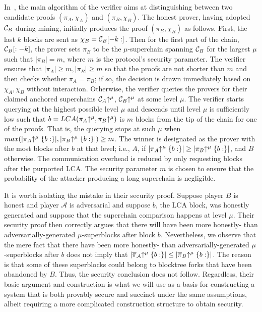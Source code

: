 In~\cite{KLS}, the main algorithm of the verifier aims at distinguishing
between two candidate proofs $(\pi_A, \chi_A)$ and $(\pi_B, \chi_B)$. The honest
prover, having adopted $\mathcal{C}_B$ during mining, initially produces the proof
$(\pi_B, \chi_B)$ as follows. First, the last $k$ blocks are sent as $\chi_B =
\mathcal{C}_B[-k:]$. Then for the first part of the chain, $\mathcal{C}_B[:-k]$, the
prover sets $\pi_B$ to be the $\mu$-superchain spanning $\mathcal{C}_B$ for the
largest $\mu$ such that $|\pi_B| = m$, where $m$ is the protocol's security
parameter. The verifier ensures that $|\pi_A| \geq m, |\pi_B| \geq m$ so that
the proofs are not shorter than $m$ and then checks whether $\pi_A = \pi_B$; if
so, the decision is drawn immediately based on $\chi_A,\chi_B$ without
interaction. Otherwise, the verifier queries the provers for their claimed
anchored superchains $\mathcal{C}_A\negthickspace\uparrow^\mu$, $\mathcal{C}_B\negthickspace\uparrow^\mu$ at some
level $\mu$. The verifier starts querying at the highest possible level $\mu$
and descends until level $\mu$ is sufficiently low such that $b =
LCA(\pi_A\negthickspace\uparrow^\mu, \pi_B\negthickspace\uparrow^\mu)$ is $m$ blocks from the tip of the
chain for one of the proofs. That is, the querying stops at such $\mu$ when
$max(|\pi_A\negthickspace\uparrow^\mu\{b:\}|, |\pi_B\negthickspace\uparrow^\mu\{b:\}|) \geq m$. The winner
is designated as the prover with the most blocks after $b$ at that level; i.e.,
$A$, if $|\pi_A\negthickspace\uparrow^\mu\{b:\}| \geq |\pi_B\negthickspace\uparrow^\mu\{b:\}|$, and $B$
otherwise. The communication overhead is reduced by only requesting blocks after
the purported LCA. The security parameter $m$ is chosen to ensure that the
probability of the attacker producing a long superchain is negligible.

It is worth isolating the mistake in their security proof. Suppose player $B$ is
honest and player $\mathcal{A}$ is adversarial and suppose $b$, the LCA block,
was honestly generated and suppose that the superchain comparison happens at
level $\mu$. Their security proof then correctly argues that there will have
been more honestly- than adversarially-generated $\mu$-superblocks after block
$b$. Nevertheless, we observe that the mere fact that there have been more
honestly- than adversarially-generated $\mu$-superblocks after $b$ does not
imply that $|\overline\pi_\mathcal{A}\negthickspace\uparrow^\mu\{b:\}| \leq
|\overline\pi_B\negthickspace\uparrow^\mu\{b:\}|$. The reason is that some of these
superblocks could belong to blocktree forks that have been abandoned by $B$.
Thus, the security conclusion does not follow. Regardless, their basic argument
and construction is what we will use as a basis for constructing a system that
is both provably secure and succinct under the same assumptions, albeit
requiring a more complicated construction structure to obtain security.
